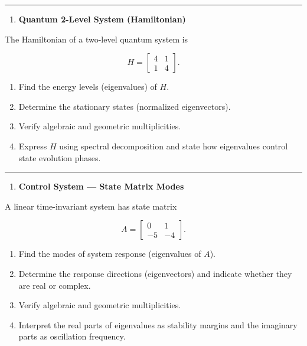 \documentclass[
  letterpaper,
  DIV=11,
  numbers=noendperiod]{scrreprt}
\providecommand{\tightlist}{%
  \setlength{\itemsep}{0pt}\setlength{\parskip}{0pt}}
\begin{document}
\begin{center}\rule{0.5\linewidth}{0.5pt}\end{center}

\begin{enumerate}
\def\labelenumi{\arabic{enumi}.}
\setcounter{enumi}{3}
\tightlist
\item
  \textbf{Quantum 2-Level System (Hamiltonian)}
\end{enumerate}

The Hamiltonian of a two-level quantum system is

\[H = \begin{bmatrix}4 & 1 \\ 1 & 4\end{bmatrix}.\]

\begin{enumerate}
\def\labelenumi{(\alph{enumi})}
\item
  Find the energy levels (eigenvalues) of \(H\).
\item
  Determine the stationary states (normalized eigenvectors).
\item
  Verify algebraic and geometric multiplicities.
\item
  Express \(H\) using spectral decomposition and state how eigenvalues
  control state evolution phases.
\end{enumerate}

\begin{center}\rule{0.5\linewidth}{0.5pt}\end{center}

\begin{enumerate}
\def\labelenumi{\arabic{enumi}.}
\setcounter{enumi}{4}
\tightlist
\item
  \textbf{Control System --- State Matrix Modes}
\end{enumerate}

A linear time-invariant system has state matrix

\[A = \begin{bmatrix}0 & 1 \\ -5 & -4\end{bmatrix}.\]

\begin{enumerate}
\def\labelenumi{(\alph{enumi})}
\item
  Find the modes of system response (eigenvalues of \(A\)).
\item
  Determine the response directions (eigenvectors) and indicate whether
  they are real or complex.
\item
  Verify algebraic and geometric multiplicities.
\item
  Interpret the real parts of eigenvalues as stability margins and the
  imaginary parts as oscillation frequency.
\end{enumerate}
\end{document}
